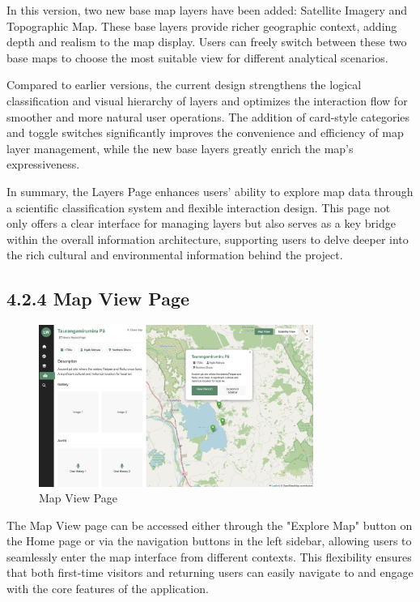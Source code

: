 In this version, two new base map layers have been added: Satellite Imagery and Topographic Map. These base layers provide richer geographic context, adding depth and realism to the map display. Users can freely switch between these two base maps to choose the most suitable view for different analytical scenarios.

Compared to earlier versions, the current design strengthens the logical classification and visual hierarchy of layers and optimizes the interaction flow for smoother and more natural user operations. The addition of card-style categories and toggle switches significantly improves the convenience and efficiency of map layer management, while the new base layers greatly enrich the map's expressiveness.

In summary, the Layers Page enhances users' ability to explore map data through a scientific classification system and flexible interaction design. This page not only offers a clear interface for managing layers but also serves as a key bridge within the overall information architecture, supporting users to delve deeper into the rich cultural and environmental information behind the project.

\subsection*{4.2.4 Map View Page}
\begin{figure}[H]
    \centering
    \includegraphics[width=0.8\textwidth]{screenshot/prototype_mapview.png}
    \caption{Map View Page}
    \label{fig:architecture}
\end{figure}

The Map View page can be accessed either through the "Explore Map" button on the Home page or via the navigation buttons in the left sidebar, allowing users to seamlessly enter the map interface from different contexts. This flexibility ensures that both first-time visitors and returning users can easily navigate to and engage with the core features of the application.

